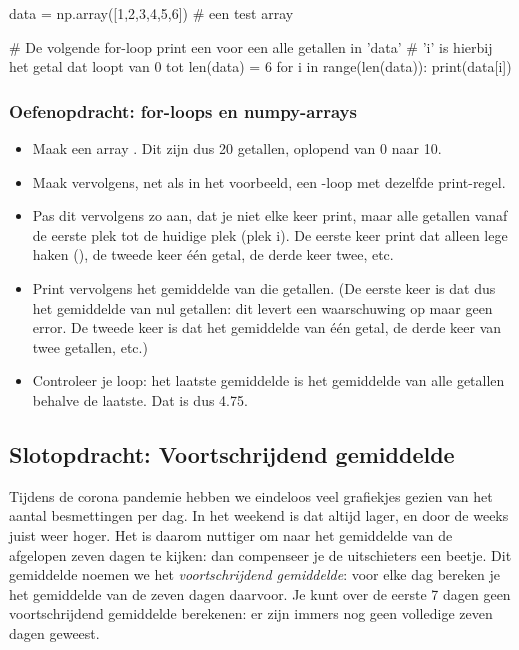 \documentclass[a4paper,11pt, fleqn]{article}
\begin{document}
\begin{python}
data = np.array([1,2,3,4,5,6]) # een test array

# De volgende for-loop print een voor een alle getallen in 'data'
# 'i' is hierbij het getal dat loopt van 0 tot len(data) = 6
for i in range(len(data)):
    print(data[i])
\end{python}

\subsubsection*{Oefenopdracht: for-loops en numpy-arrays}
\begin{itemize}
	\item Maak een array . Dit zijn dus 20 getallen, oplopend van 0 naar 10.
	\item Maak vervolgens, net als in het voorbeeld, een -loop met dezelfde print-regel.
	\item Pas dit vervolgens zo aan, dat je niet elke keer  print, maar alle getallen vanaf de eerste plek tot de huidige plek (plek i). De eerste keer print dat alleen lege haken (\pythoninline{[]}), de tweede keer \'e\'en getal, de derde keer twee, etc.
	\item Print vervolgens het gemiddelde van die getallen. (De eerste keer is dat dus het gemiddelde van nul getallen: dit levert een waarschuwing op maar geen error. De tweede keer is dat het gemiddelde van \'e\'en getal, de derde keer van twee getallen, etc.)
	\item Controleer je loop: het laatste gemiddelde is het gemiddelde van alle getallen behalve de laatste. Dat is dus 4.75.
\end{itemize}

\subsection{Slotopdracht: Voortschrijdend gemiddelde}
Tijdens de corona pandemie hebben we eindeloos veel grafiekjes gezien van het aantal besmettingen per dag. In het weekend is dat altijd lager, en door de weeks juist weer hoger. Het is daarom nuttiger om naar het gemiddelde van de afgelopen zeven dagen te kijken: dan compenseer je de uitschieters een beetje. Dit gemiddelde noemen we het {\it voortschrijdend gemiddelde}: voor elke dag bereken je het gemiddelde van de zeven dagen daarvoor. Je kunt over de eerste 7 dagen geen voortschrijdend gemiddelde berekenen: er zijn immers nog geen volledige zeven dagen geweest.
\end{document}
